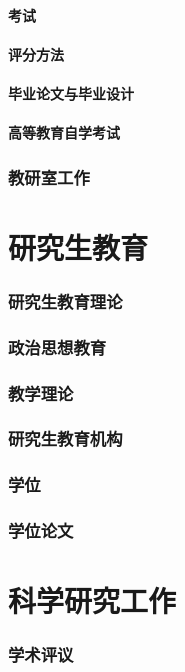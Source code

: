\documentclass[UTF8]{../../ApplicationUniverse}
\begin{document}
            \paragraph{考试}
            \paragraph{评分方法}
            \paragraph{毕业论文与毕业设计}
            \paragraph{高等教育自学考试}
    \subsubsection{教研室工作}

\section{研究生教育}
    \subsubsection{研究生教育理论}
    \subsubsection{政治思想教育}
    \subsubsection{教学理论}
    \subsubsection{研究生教育机构}
    \subsubsection{学位}
    \subsubsection{学位论文}
\section{科学研究工作}
    \subsubsection{学术评议}
\end{document}
